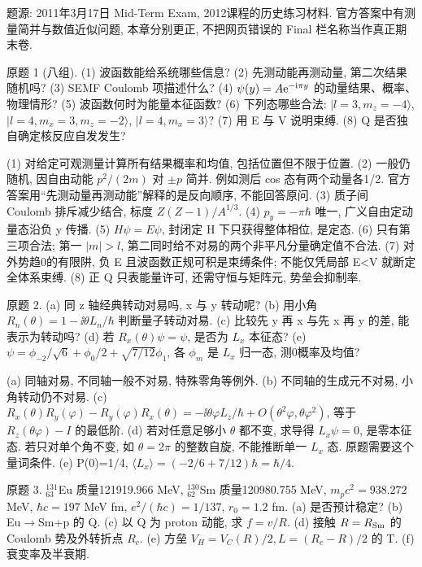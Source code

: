 题源: 2011年3月17日 Mid-Term Exam, 2012课程的历史练习材料. 官方答案中有测量简并与数值近似问题, 本章分别更正, 不把网页错误的 Final 栏名称当作真正期末卷.
\begin{exercise}\label{ex:2202-e2011-1}
原题 1 (八组). (1) 波函数能给系统哪些信息? (2) 先测动能再测动量, 第二次结果随机吗? (3) SEMF Coulomb 项描述什么? (4) $\psi(y)=A\mathrm e^{-\mathrm i\pi y}$ 的动量结果、概率、物理情形? (5) 波函数何时为能量本征函数? (6) 下列态哪些合法: $|l=3,m_z=-4\rangle$, $|l=4,m_x=3,m_z=-2\rangle$, $|l=4,m_x=3\rangle$? (7) 用 E 与 V 说明束缚. (8) Q 是否独自确定核反应自发发生?
\end{exercise}
\begin{solution}
(1) 对给定可观测量计算所有结果概率和均值, 包括位置但不限于位置. (2) 一般仍随机, 因自由动能 $p^2/(2m)$ 对 $\pm p$ 简并. 例如测后 cos 态有两个动量各1/2. 官方答案用``先测动量再测动能''解释的是反向顺序, 不能回答原问. (3) 质子间 Coulomb 排斥减少结合, 标度 $Z(Z-1)/A^{1/3}$. (4) $p_y=-\pi\hbar$ 唯一, 广义自由定动量态沿负 y 传播. (5) $H\psi=E\psi$, 封闭定 H 下只获得整体相位, 是定态. (6) 只有第三项合法; 第一 $|m|>l$, 第二同时给不对易的两个非平凡分量确定值不合法. (7) 对外势趋0的有限阱, 负 E 且波函数正规可积是束缚条件; 不能仅凭局部 E<V 就断定全体系束缚. (8) 正 Q 只表能量许可, 还需守恒与矩阵元, 势垒会抑制率.
\end{solution}
\begin{exercise}\label{ex:2202-e2011-2}
原题 2. (a) 同 z 轴经典转动对易吗, x 与 y 转动呢? (b) 用小角 $R_n(\theta)=1-\ii\theta L_n/\hbar$ 判断量子转动对易. (c) 比较先 y 再 x 与先 x 再 y 的差, 能表示为转动吗? (d) 若 $R_x(\theta)\psi=\psi$, 是否为 $L_x$ 本征态? (e) $\psi=\phi_{-2}/\sqrt6+\phi_0/2+\sqrt{7/12}\phi_1$, 各 $\phi_m$ 是 $L_x$ 归一态, 测0概率及均值?
\end{exercise}
\begin{solution}
(a) 同轴对易, 不同轴一般不对易, 特殊零角等例外. (b) 不同轴的生成元不对易, 小角转动仍不对易. (c) $R_x(\theta)R_y(\varphi)-R_y(\varphi)R_x(\theta)=-\ii\theta\varphi L_z/\hbar+O(\theta^2\varphi,\theta\varphi^2)$, 等于 $R_z(\theta\varphi)-I$ 的最低阶. (d) 若对任意足够小 $\theta$ 都不变, 求导得 $L_x\psi=0$, 是零本征态. 若只对单个角不变, 如 $\theta=2\pi$ 的整数自旋, 不能推断单一 $L_x$ 态. 原题需要这个量词条件. (e) P(0)=1/4, $\langle L_x\rangle=(-2/6+7/12)\hbar=\hbar/4$.
\end{solution}
\begin{exercise}\label{ex:2202-e2011-3}
原题 3. $^{131}_{63}$Eu 质量121919.966 MeV, $^{130}_{62}$Sm 质量120980.755 MeV, $m_pc^2=938.272$ MeV, $\hbar c=197$ MeV fm, $e^2/(\hbar c)=1/137$, $r_0=1.2$ fm. (a) 是否预计稳定? (b) Eu$\to$Sm+p 的 Q. (c) 以 Q 为 proton 动能, 求 $f=v/R$. (d) 接触 $R=R_{\rm Sm}$ 的 Coulomb 势及外转折点 $R_c$. (e) 方垒 $V_H=V_C(R)/2,L=(R_c-R)/2$ 的 T. (f) 衰变率及半衰期.
\end{exercise}
